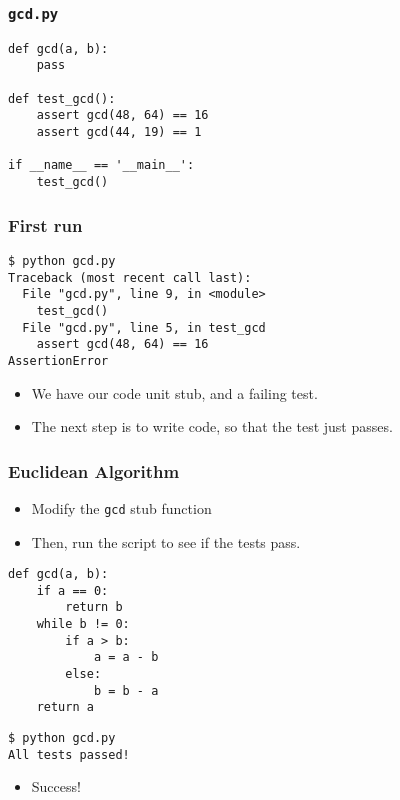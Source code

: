 \documentclass[14pt,compress]{beamer}
\begin{document}
\begin{frame}[fragile]
  \frametitle{\texttt{gcd.py}}
\begin{lstlisting}
def gcd(a, b):
    pass

def test_gcd():
    assert gcd(48, 64) == 16
    assert gcd(44, 19) == 1

if __name__ == '__main__':
    test_gcd()
\end{lstlisting}
\end{frame}

\begin{frame}[fragile]
  \frametitle{First run}
\begin{lstlisting}
$ python gcd.py
Traceback (most recent call last):
  File "gcd.py", line 9, in <module>
    test_gcd()
  File "gcd.py", line 5, in test_gcd
    assert gcd(48, 64) == 16
AssertionError
\end{lstlisting} %

  \begin{itemize}
  \item We have our code unit stub, and a failing test.
  \item The next step is to write code, so that the test just passes.
  \end{itemize}
\end{frame}

\begin{frame}
  \frametitle{Euclidean Algorithm}
  \begin{itemize}
  \item Modify the \texttt{gcd} stub function
  \item Then, run the script to see if the tests pass.
  \end{itemize}
\begin{lstlisting}
def gcd(a, b):
    if a == 0:
        return b
    while b != 0:
        if a > b:
            a = a - b
        else:
            b = b - a
    return a
\end{lstlisting}
\begin{lstlisting}
$ python gcd.py
All tests passed!
\end{lstlisting} %
  \begin{itemize}
  \item \alert{Success!}
  \end{itemize}
\end{frame}
\end{document}
